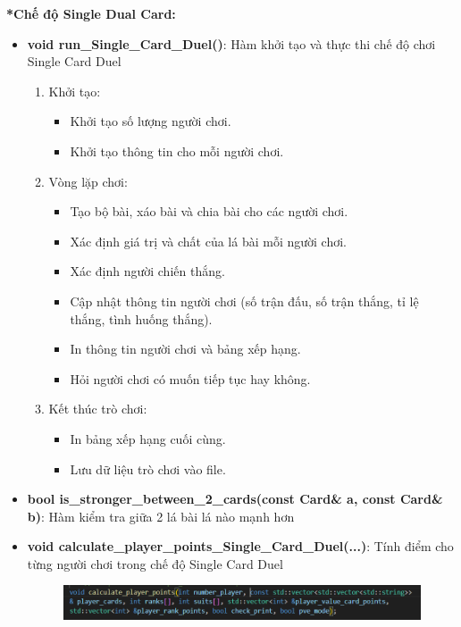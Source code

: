 \documentclass{article}
\begin{document}
\textbf{\fontsize{17pt}{0pt} *Chế độ Single Dual Card:}
\begin{itemize}
    \item \textbf{void run\_Single\_Card\_Duel()}: Hàm khởi tạo và thực thi chế độ chơi Single Card Duel
    \begin{description}
            \begin{enumerate}
            \item Khởi tạo:
                \begin{itemize}
                    \item Khởi tạo số lượng người chơi.
                    \item Khởi tạo thông tin cho mỗi người chơi.
                \end{itemize}
            \item Vòng lặp chơi:
                \begin{itemize}
                    \item Tạo bộ bài, xáo bài và chia bài cho các người chơi.
                    \item Xác định giá trị và chất của lá bài mỗi người chơi.
                    \item Xác định người chiến thắng.
                    \item Cập nhật thông tin người chơi (số trận đấu, số trận thắng, tỉ lệ thắng, tình huống thắng).
                    \item In thông tin người chơi và bảng xếp hạng.
                    \item Hỏi người chơi có muốn tiếp tục hay không.
                \end{itemize}
            \item Kết thúc trò chơi:
                \begin{itemize}
                    \item In bảng xếp hạng cuối cùng.
                    \item Lưu dữ liệu trò chơi vào file.
                \end{itemize}
        \end{enumerate}
    \end{description}
    \item \textbf{bool is\_stronger\_between\_2\_cards(const Card\& a, const Card\& b)}: Hàm kiểm tra giữa 2 lá bài lá nào mạnh hơn
        
    \item \textbf{void calculate\_player\_points\_Single\_Card\_Duel(...)}: Tính điểm cho từng người chơi trong chế độ Single Card Duel
    \begin{figure}[h!]
        \centering
        \includegraphics[width=1\textwidth]{images/screenshot/calc_player.png}
    \end{figure}


\end{itemize}
\end{document}
